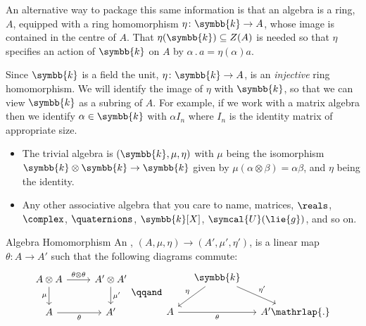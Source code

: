 \documentclass[fleqn]{NotesClass}
\renewcommand{\field}{\symbb{k}}
\newcommand{\action}{\mathbin{.}}
\newcommand{\universalEnveloping}{\symcal{U}}
\begin{document}
    An alternative way to package this same information is that an algebra is a ring, \(A\), equipped with a ring homomorphism \(\eta \colon \field \to A\), whose image is contained in the centre of \(A\).
    That \(\eta(\field) \subseteq Z(A)\) is needed so that \(\eta\) specifies an action of \(\field\) on \(A\) by \(\alpha \action a = \eta(\alpha)a\).
    
    Since \(\field\) is a field the unit, \(\eta \colon \field \to A\), is an \emph{injective} ring homomorphism.
    We will identify the image of \(\eta\) with \(\field\), so that we can view \(\field\) as a subring of \(A\).
    For example, if we work with a matrix algebra then we identify \(\alpha \in \field\) with \(\alpha I_n\) where \(I_n\) is the identity matrix of appropriate size.
    
    \begin{exm}{}{}
        \begin{itemize}
            \item The trivial algebra is \((\field, \mu, \eta)\) with \(\mu\) being the isomorphism \(\field \otimes \field \to \field\) given by \(\mu(\alpha \otimes \beta) = \alpha \beta\), and \(\eta\) being the identity.
            \item Any other associative algebra that you care to name, matrices, \(\reals\), \(\complex\), \(\quaternions\), \(\field[X]\), \(\universalEnveloping(\lie{g})\), and so on.
        \end{itemize}
    \end{exm}
    
    \begin{dfn}{Algebra Homomorphism}{}
        An , \((A, \mu, \eta) \to (A', \mu', \eta')\), is a linear map \(\theta \colon A \to A'\) such that the following diagrams commute:
        \begin{equation}
            \begin{tikzcd}
                A \otimes A \arrow[r, "\theta \otimes \theta"] \arrow[d, "\mu"'] & A' \otimes A' \arrow[d, "\mu'"]\\
                A \arrow[r, "\theta"'] & A'
            \end{tikzcd}
            \qqand
            \begin{tikzcd}[column sep=small]
                & \field \arrow[dl, "\eta"'] \arrow[dr, "\eta'"]\\
                A \arrow[rr, "\theta"'] && A' \mathrlap{.}
            \end{tikzcd}
        \end{equation}
    \end{dfn}
    
\end{document}

